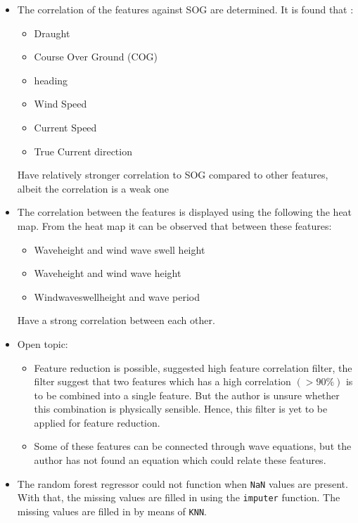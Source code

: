 \begin{itemize}
    \item The correlation of the features against SOG are determined. It is found that :
    \begin{itemize}
        \item Draught
        \item Course Over Ground (COG)
        \item heading
        \item Wind Speed
        \item Current Speed
        \item True Current direction
    \end{itemize}
    Have relatively stronger correlation to SOG compared to other features, albeit the correlation is a weak one
    \item The correlation between the features is displayed using the following the heat map. From the heat map it can be observed that between these features:
    \begin{itemize}
        \item Waveheight and wind wave swell height
        \item Waveheight and wind wave height
        \item Windwaveswellheight and wave period
    \end{itemize}
    Have a strong correlation between each other.  
    \item Open topic: 
    \begin{itemize}
        \item Feature reduction is possible, \cite{Abebe.2020} suggested high feature correlation filter, the filter suggest that two features which has a high correlation $(>90\%)$ is to be combined into a single feature. But the author is unsure whether this combination is physically sensible. Hence, this filter is yet to be applied for feature reduction. 
        \item Some of these features can be connected through wave equations, but the author has not found an equation which could relate these features.
    \end{itemize}
    \item The random forest regressor could not function when \verb|NaN| values are present. With that, the missing values are filled in using the {\tt imputer} function. The missing values are filled in by means of \verb|KNN|.
\end{itemize}

